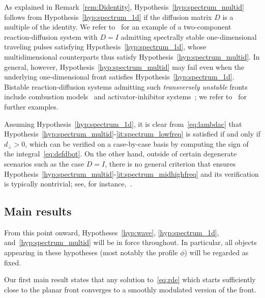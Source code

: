 \documentclass[12pt,oneside,a4paper,reqno]{amsart}
\numberwithin{equation}{section}
\theoremstyle{definition}
\theoremstyle{remark}
\begin{document}
As explained in Remark~\ref{rem:Didentity}, Hypothesis~\ref{hyp:spectrum_multid} follows from Hypothesis~\ref{hyp:spectrum_1d} if the diffusion matrix $D$ is a multiple of the identity. We refer to~\cite{cornwell_existence_2018} for an example of a two-component reaction-diffusion system with $D = I$ admitting spectrally stable one-dimensional traveling pulses satisfying Hypothesis~\ref{hyp:spectrum_1d}, whose multidimensional counterparts thus satisfy Hypothesis~\ref{hyp:spectrum_multid}. In general, however, Hypothesis~\ref{hyp:spectrum_multid} may fail even when the underlying one-dimensional front satisfies Hypothesis~\ref{hyp:spectrum_1d}.
Bistable reaction-diffusion systems admitting such \emph{transversely unstable} fronts include combustion models~\cite{terman_stability_1990} and activator-inhibitor systems~\cite{taniguchi_instability_2003}; we refer to~\cite{carter_criteria_2023} for further examples.

Assuming Hypothesis~\ref{hyp:spectrum_1d}, it is clear from~\eqref{eq:lambdac} that Hypothesis~\ref{hyp:spectrum_multid}-\ref{it:spectrum_lowfreq} is satisfied if and only if $d_{\bot} > 0$, which can be verified on a case-by-case basis by computing the sign of the integral~\eqref{eq:defdbot}. On the other hand, outside of certain degenerate scenarios such as the case $D = I$, there is no general criterion that ensures Hypothesis~\ref{hyp:spectrum_multid}-\ref{it:spectrum_midhighfreq} and its verification is typically nontrivial; see, for instance,~\cite{bastiaansen_stable_2019}. 

\subsection{Main results}
\label{subsec:mainresults}
From this point onward, Hypotheses~\ref{hyp:wave}, \ref{hyp:spectrum_1d}, and~\ref{hyp:spectrum_multid} will be in force throughout. In particular, all objects appearing in these hypotheses (most notably the profile $\phi$) will be regarded as fixed.

Our first main result states that any solution to~\eqref{eq:rde} which starts sufficiently close to the planar front converges to a smoothly modulated version of the front.
\end{document}
